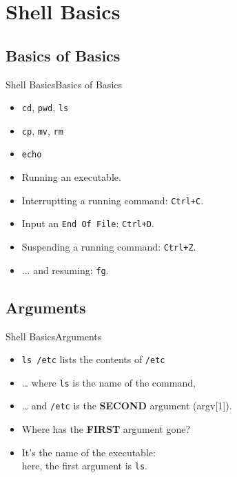 \documentclass[aspectratio=169]{beamer}
\begin{document}
\section{Shell Basics}\label{shell-basics}

\subsection{Basics of Basics}
\begin{frame}{Shell Basics}{Basics of Basics}

\begin{itemize}[<+->]
\item
  \texttt{cd}, \texttt{pwd}, \texttt{ls}
\item
  \texttt{cp}, \texttt{mv}, \texttt{rm}
\item
  \texttt{echo}
\item
  Running an executable.
\item
  Interruptting a running command: \texttt{Ctrl+C}.
\item
  Input an \texttt{End Of File}: \texttt{Ctrl+D}.
\item
  Suspending a running command: \texttt{Ctrl+Z}.
\item
  ... and resuming: \texttt{fg}.
\end{itemize}

\end{frame}

\subsection{Arguments}
\begin{frame}{Shell Basics}{Arguments}

\begin{itemize}[<+->]
\item
  \texttt{ls\ /etc} lists the contents of \texttt{/etc}
\item
  \ldots{} where \texttt{ls} is the name of the command,
\item
  \ldots{} and \texttt{/etc} is the \textbf{SECOND} argument
  (argv{[}1{]}).
\item
  Where has the \textbf{FIRST} argument gone?
\item
  It's the name of the executable:\\
  here, the first argument is \texttt{ls}.
\end{itemize}

\end{frame}
\end{document}
